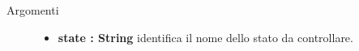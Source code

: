 \begin{description}
\begin{description}
		\begin{description}
			\item[Argomenti] \hfill
				\begin{itemize}
				
					\item \textbf{state : String			} \hfill
					identifica il nome dello stato da controllare.
					
				\end{itemize}
		\end{description}
	\end{description}
		
\end{description}
